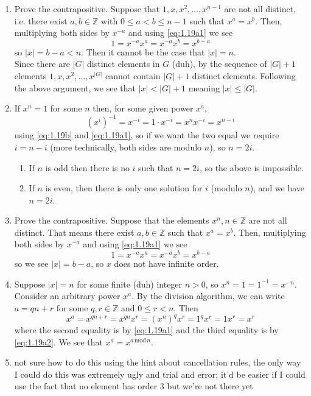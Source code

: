 \documentclass[]{article}
\newcommand{\abs}[1]{\left\vert #1 \right\vert}
\newcommand{\md}{\,\text{mod}\,}
\newcommand{\bbz}{\mathbb{Z}}
\begin{document}
\begin{enumerate}
\item Prove the contrapositive. Suppose that $1, x, x^2, \ldots, x^{n-1}$ are not all distinct, i.e. there exist $a,b \in\bbz$ with $0 \leq a < b \leq n-1$ such that $x^a = x^b$. Then, multiplying both sides by $x^{-a}$ and using \eqref{eq:1.19a1} we see
\begin{equation}
1 = x^{-a}x^a = x^{-a}x^b = x^{b-a}
\end{equation}
so $\abs{x} = b-a < n$. Then it cannot be the case that $\abs{x} = n$. \\
Since there are $\abs{G}$ distinct elements in $G$ (duh), by the sequence of $\abs{G}+1$ elements $1, x, x^2, \ldots, x^{\abs{G}}$ cannot contain $\abs{G}+1$ distinct elements. Following the above argument, we see that $\abs{x} < \abs{G}+1$ meaning $\abs{x} \leq \abs{G}$.


\item If $x^n = 1$ for some $n$ then, for some given power $x^a$,
\begin{equation}
(x^i)^{-1} = x^{-i} = 1\cdot x^{-i} = x^n x^{-i} = x^{n-i}
\end{equation}
using \eqref{eq:1.19b} and \eqref{eq:1.19a1}, so if we want the two equal we require $i = n-i$ (more technically, both sides are modulo $n$), so $n = 2i$.
\begin{enumerate}
\item If $n$ is odd then there is no $i$ such that $n=2i$, so the above is impossible.
\item If $n$ is even, then there is only one solution for $i$ (modulo $n$), and we have $n = 2i$.
\end{enumerate}


\item Prove the contrapositive. Suppose that the elements $x^n, n\in\bbz$ are not all distinct. That means there exist $a,b \in\bbz$ such that $x^a = x^b$. Then, multiplying both sides by $x^{-a}$ and using \eqref{eq:1.19a1} we see
\begin{equation}
1 = x^{-a}x^a = x^{-a}x^b = x^{b-a}
\end{equation}
so we see $\abs{x} = b-a$, so $x$ does not have infinite order.


\item Suppose $\abs{x} = n$ for some finite (duh) integer $n>0$, so $x^n = 1 = 1^{-1} = x^{-n}$. Consider an arbitrary power $x^a$. By the division algorithm, we can write $a = qn + r$ for some $q,r\in\bbz$ and $0 \leq r < n$. Then
\begin{equation}
x^a = x^{qn+r} = x^{qn}x^r = (x^n)^qx^r = 1^qx^r = 1x^r = x^r
\end{equation}
where the second equality is by \eqref{eq:1.19a1} and the third equality is by \eqref{eq:1.19a2}. We see that $x^a = x^{a\md n}$.


\item {\color{red} not sure how to do this using the hint about cancellation rules, the only way I could do this was extremely ugly and trial and error; it'd be easier if I could use the fact that no element has order 3 but we're not there yet}

\end{enumerate}
\end{document}
